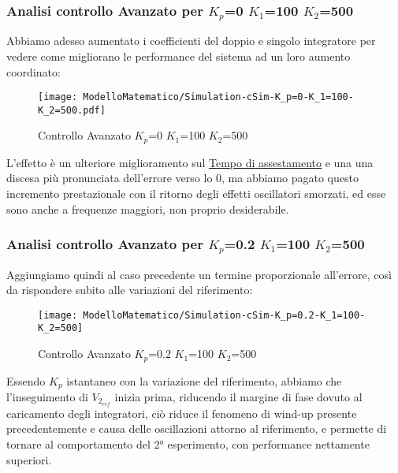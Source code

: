 \subsubsection{Analisi controllo Avanzato per $ K_p $=0 $ K_1 $=100 $ K_2 $=500}
Abbiamo adesso aumentato i coefficienti del doppio e singolo integratore per vedere come migliorano le performance del sistema ad un loro aumento coordinato:
\begin{figure}[H]
	\centering
	\caption[Controllo Avanzato $ K_p $=0 $ K_1 $=100 $ K_2 $=500]{Controllo Avanzato $ K_p $=0 $ K_1 $=100 $ K_2 $=500}
	\texttt{[image: ModelloMatematico/Simulation-cSim-K\_p=0-K\_1=100-K\_2=500.pdf]}
\end{figure}
\noindent
L'effetto è un ulteriore miglioramento sul \underline{Tempo di assestamento} e una una discesa più pronunciata dell'errore verso lo 0, ma abbiamo pagato questo incremento prestazionale con il ritorno degli effetti oscillatori smorzati, ed esse sono anche a frequenze maggiori, non proprio desiderabile. 

\newpage

\subsubsection{Analisi controllo Avanzato per $ K_p $=0.2 $ K_1 $=100 $ K_2 $=500}
Aggiungiamo quindi al caso precedente un termine proporzionale all'errore, così da rispondere subito alle variazioni del riferimento: 
\begin{figure}[H]
	\centering
	\caption[Controllo Avanzato $ K_p $=0.2 $ K_1 $=100 $ K_2 $=500]{Controllo Avanzato $ K_p $=0.2 $ K_1 $=100 $ K_2 $=500}
	\texttt{[image: ModelloMatematico/Simulation-cSim-K\_p=0.2-K\_1=100-K\_2=500]}
\end{figure}
\noindent
Essendo $ K_p $ istantaneo con la variazione del riferimento, abbiamo che l'inseguimento di $ V_{2_{ref}} $ inizia prima, riducendo il margine di fase dovuto al caricamento degli integratori, ciò riduce il fenomeno di wind-up presente precedentemente e causa delle oscillazioni attorno al riferimento, e permette di tornare al comportamento del 2° esperimento, con performance nettamente superiori.

\newpage

